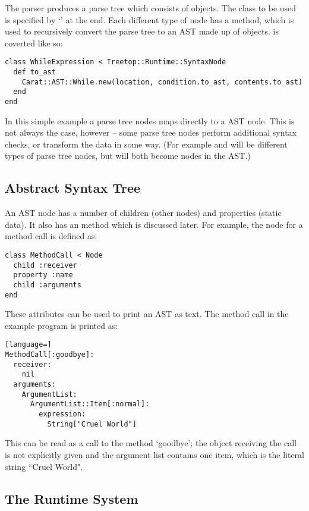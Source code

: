 The parser produces a parse tree which consists of  objects. The class to be used is specified by `' at the end. Each different type of node has a  method, which is used to recursively convert the parse tree to an AST made up of  objects.  is coverted like so:

\begin{lstlisting}
class WhileExpression < Treetop::Runtime::SyntaxNode
  def to_ast
    Carat::AST::While.new(location, condition.to_ast, contents.to_ast)
  end
end
\end{lstlisting}

In this simple example a  parse tree nodes maps directly to a  AST node. This is not always the case, however -- some parse tree nodes perform additional syntax checks, or transform the data in some way. (For example  and  will be different types of parse tree nodes, but will both become  nodes in the AST.)

\subsection{Abstract Syntax Tree}

An AST node has a number of children (other nodes) and properties (static data). It also has an  method which is discussed later. For example, the node for a method call is defined as:

\begin{lstlisting}
class MethodCall < Node
  child :receiver
  property :name
  child :arguments
end
\end{lstlisting}

These attributes can be used to print an AST as text. The method call in the example program is printed as:

\begin{lstlisting}[language=]
MethodCall[:goodbye]:
  receiver:
    nil
  arguments:
    ArgumentList:
      ArgumentList::Item[:normal]:
        expression:
          String["Cruel World"]
\end{lstlisting}

This can be read as a call to the method `goodbye'; the object receiving the call is not explicitly given and the argument list contains one item, which is the literal string ``Cruel World".

\subsection{The Runtime System}

